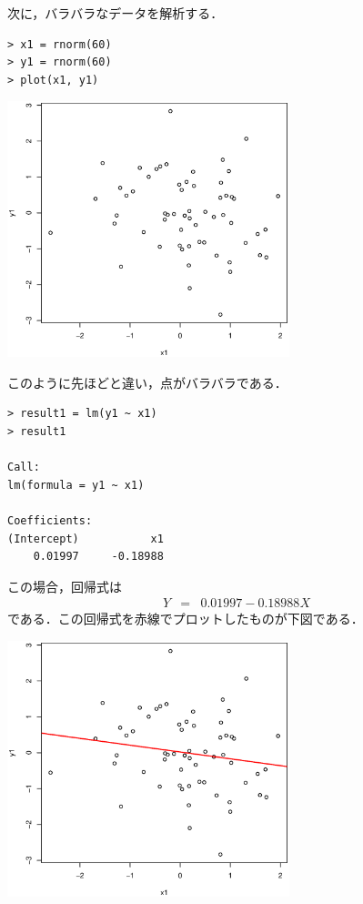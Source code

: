 次に，バラバラなデータを解析する．
\begin{breakbox}
\begin{verbatim}
> x1 = rnorm(60)
> y1 = rnorm(60)
> plot(x1, y1)
\end{verbatim}
\begin{center}
\includegraphics[width=8.2cm]{img/plot1.eps}
\end{center}
\end{breakbox}
このように先ほどと違い，点がバラバラである．
\begin{breakbox}
\begin{verbatim}
> result1 = lm(y1 ~ x1)
> result1

Call:
lm(formula = y1 ~ x1)

Coefficients:
(Intercept)           x1  
    0.01997     -0.18988  
\end{verbatim}
\end{breakbox}
この場合，回帰式は
\begin{eqnarray*}
Y&=&0.01997-0.18988X
\end{eqnarray*}
である．この回帰式を赤線でプロットしたものが下図である．
\begin{center}
\includegraphics[width=8.2cm]{img/abline1.eps}
\end{center}

